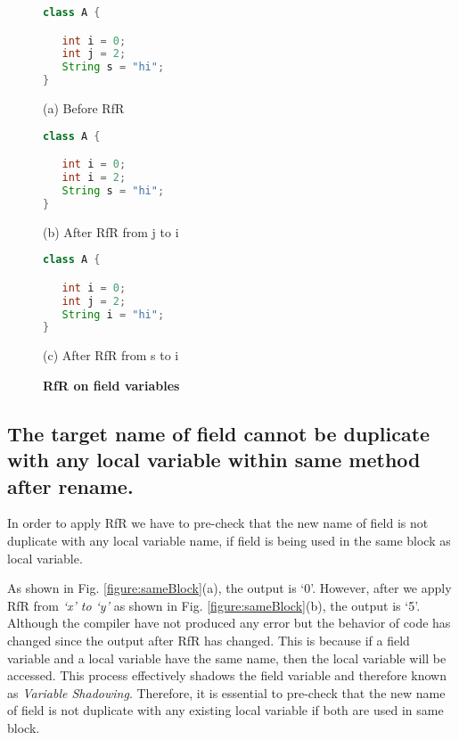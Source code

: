 \begin{figure}[th]
\centering	
\begin{minipage}[t]{0.45\linewidth}
\begin{lstlisting}[language=java, basicstyle=\scriptsize\ttfamily,frame=single]
class A {

   int i = 0;
   int j = 2;
   String s = "hi";
}

\end{lstlisting}
\centering(a) Before RfR
\end{minipage}
\hfill
\begin{minipage}[t]{0.45\linewidth}
\begin{lstlisting}[language=java, basicstyle=\scriptsize\ttfamily,frame=single]
class A {

   int i = 0;
   int i = 2;
   String s = "hi";
}
\end{lstlisting}
\centering(b) After RfR from j to i
\end{minipage}

\centering
\begin{minipage}[t]{0.45\linewidth}
\begin{lstlisting}[language=java, basicstyle=\scriptsize\ttfamily,frame=single]
class A {

   int i = 0;
   int j = 2;
   String i = "hi";
}
\end{lstlisting}
\centering(c) After RfR from s to i
\end{minipage}
\caption{\textbf{RfR on field variables}}
\label{figure:field}
\end{figure}


\subsection{The target name of field cannot be duplicate with any local variable within same method after rename.}
In order to apply RfR we have to pre-check that the new name of field is not duplicate with any local variable name, if field is being used in the same block as local variable. 

As shown in Fig. \ref{figure:sameBlock}(a), the output is `0'. However, after we apply RfR from \emph{`x' to `y'} as shown in Fig. \ref{figure:sameBlock}(b), the output is `5'. Although the compiler have not produced any error but the behavior of code has changed since the output after RfR has changed. This is because if a field variable and a local variable have the same name, then the local variable will be accessed. This process effectively shadows the field variable and therefore known as \textit{Variable Shadowing}. Therefore, it is essential to pre-check that the new name of field is not duplicate with any existing local variable if both are used in same block.
 

